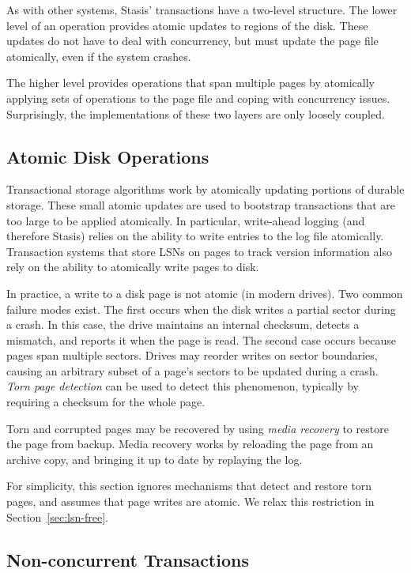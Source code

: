 \documentclass[letterpaper,twocolumn,10pt]{article}
\newcommand{\yad}{Stasis\xspace}
\newcommand{\yads}{Stasis'\xspace}
\begin{document}
As with other systems, \yads transactions have a two-level structure.
The lower level of an operation provides atomic updates to regions of
the disk.  These updates do not have to deal with concurrency, but
must update the page file atomically, even if the system crashes.

The higher level provides operations that span multiple pages by
atomically applying sets of operations to the page file and coping
with concurrency issues.  Surprisingly, the implementations of these
two layers are only loosely coupled.


\subsection{Atomic Disk Operations}

Transactional storage algorithms work by
atomically updating portions of durable storage.  These small atomic
updates are used to bootstrap transactions that are too large to be
applied atomically.  In particular, write-ahead logging (and therefore
\yad) relies on the ability to write entries to the log
file atomically.  Transaction systems that store LSNs on pages to 
track version information also rely on the ability to atomically 
write pages to disk.

In practice, a write to a disk page is not atomic (in modern drives).  Two common failure
modes exist.  The first occurs when the disk writes a partial sector
during a crash.  In this case, the drive maintains an internal
checksum, detects a mismatch, and reports it when the page is read.
The second case occurs because pages span multiple sectors.  Drives
may reorder writes on sector boundaries, causing an arbitrary subset
of a page's sectors to be updated during a crash.  {\em Torn page
detection} can be used to detect this phenomenon, typically by
requiring a checksum for the whole page. 

Torn and corrupted pages may be recovered by using {\em media
recovery} to restore the page from backup.  Media recovery works by
reloading the page from an archive copy, and bringing it up to date by
replaying the log.

For simplicity, this section ignores mechanisms that detect
and restore torn pages, and assumes that page writes are atomic.
We relax this restriction in Section~\ref{sec:lsn-free}.

\subsection{Non-concurrent Transactions}
\end{document}
